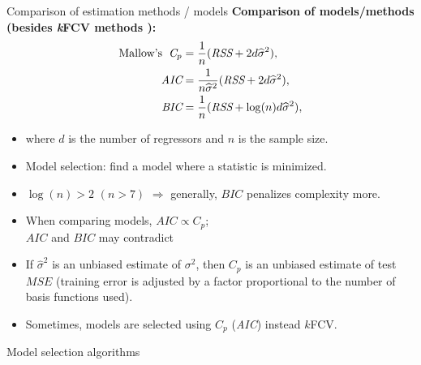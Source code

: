 \documentclass{beamer}
\begin{document}
\begin{frame}{Comparison of estimation methods / models}
\textbf{Comparison of models/methods (besides \textbf{\textit{k}FCV methods} ):} 
\begin{equation} \notag
\begin{aligned}
 \textnormal{Mallow's} \hspace{0.2cm}
 \textit{C}_{p} &=\frac{1}{n}(\textit{RSS}+2d\widehat{\sigma}^2), \\
 \smallskip
 \textit{AIC} &=\frac{1}{n\widehat{\sigma}^2}(\textit{RSS}+2d\widehat{\sigma}^2), \\
 \smallskip
 \textit{BIC} &=\frac{1}{n}(\textit{RSS}+\log(n)d\widehat{\sigma}^2),
 \end{aligned}
\end{equation}

\begin{itemize}
\item where $d$ is the number of regressors and $n$ is the sample size.
\item Model selection: find a model where a statistic is minimized.
\item $\log(n)>2$ $(n\!>\!7)$ $\Rightarrow$ generally, $\textit{BIC}$ penalizes complexity more.
\item When comparing models, $\textit{AIC} \propto C_p$;~~ \\$\textit{AIC}$ and $\textit{BIC}$ may contradict 
\item If $\widehat{\sigma}^2$ is an unbiased estimate of ${\sigma}^2$, then $C_p$ is an unbiased estimate of test $\textit{MSE}$ (training error is adjusted by a factor proportional to the number of basis functions used).
\item Sometimes, models are selected using $C_p$ (\textit{AIC}) instead $k$FCV.
\end{itemize}
\end{frame}
\begin{frame}{Model selection algorithms}
\end{frame}
\end{document}
